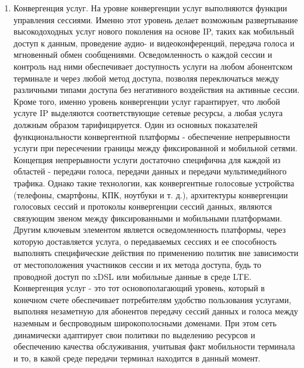 \begin{enumerate}
\item Конвергенция услуг. На уровне конвергенции услуг выполняются функции управления сессиями. Именно этот уровень делает возможным развертывание высокодоходных услуг нового поколения на основе IP, таких как мобильный доступ к данным, проведение аудио- и видеоконференций, передача голоса и мгновенный обмен сообщениями. Осведомленность о каждой сессии и контроль над ними обеспечивает доступность услуги на любом абонентском терминале и через любой метод доступа, позволяя переключаться между различными типами доступа без негативного воздействия на активные сессии. Кроме того, именно уровень конвергенции услуг гарантирует, что любой услуге IP выделяются соответствующие сетевые ресурсы, а любая услуга должным образом тарифицируется. Один из основных показателей функциональности конвергентной платформы - обеспечение непрерывности услуги при пересечении границы между фиксированной и мобильной сетями. Концепция непрерывности услуги достаточно специфична для каждой из областей - передачи голоса, передачи данных и передачи мультимедийного трафика. Однако такие технологии, как конвергентные голосовые устройства (телефоны, смартфоны, КПК, ноутбуки и т. д.), архитектуры конвергенции голосовых сессий и протоколы конвергенции сессий данных, являются связующим звеном между фиксированными и мобильными платформами. Другим ключевым элементом является осведомленность платформы, через которую доставляется услуга, о передаваемых сессиях и ее способность выполнять специфические действия по применению политик вне зависимости от местоположения участников сессии и их метода доступа, будь то проводной доступ по xDSL или мобильные данные в среде LTE. Конвергенция услуг - это тот основополагающий уровень, который в конечном счете обеспечивает потребителям удобство пользования услугами, выполняя незаметную для абонентов передачу сессий данных и голоса между наземным и беспроводным широкополосными доменами. При этом сеть динамически адаптирует свои политики по выделению ресурсов и обеспечению качества обслуживания, учитывая факт мобильности терминала и то, в какой среде передачи терминал находится в данный момент.


\end{enumerate}

